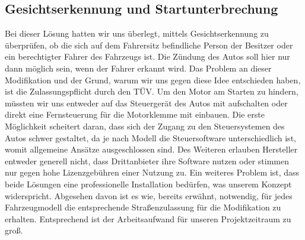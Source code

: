 \subsection{Gesichtserkennung und Startunterbrechung}
Bei dieser Lösung hatten wir uns überlegt, mittels Gesichtserkennung zu überprüfen, ob die sich auf dem Fahrersitz befindliche Person der Besitzer oder ein berechtigter Fahrer des Fahrzeugs ist. Die Zündung des Autos soll hier nur dann möglich sein, wenn der Fahrer erkannt wird. Das Problem an dieser Modifikation und der Grund, warum wir uns gegen diese Idee entschieden haben, ist die Zulassungspflicht durch den TÜV. Um den Motor am Starten zu hindern, müssten wir uns entweder auf das Steuergerät des Autos mit aufschalten oder direkt eine Fernsteuerung für die Motorklemme mit einbauen. Die erste Möglichkeit scheitert daran, dass sich der Zugang zu den Steuersystemen des Autos schwer gestaltet, da je nach Modell die Steuersoftware unterschiedlich ist, womit allgemeine Ansätze ausgeschlossen sind. Des Weiteren erlauben Hersteller entweder generell nicht, dass Drittanbieter ihre Software nutzen oder stimmen nur gegen hohe Lizenzgebühren einer Nutzung zu. Ein weiteres Problem ist, dass beide Lösungen eine professionelle Installation bedürfen, was unserem Konzept widerspricht. Abgesehen davon ist es wie, bereits erwähnt, notwendig, für jedes Fahrzeugmodell die entsprechende Straßenzulassung für die Modifikation zu erhalten. Entsprechend ist der Arbeitsaufwand für unseren Projektzeitraum zu groß. 
